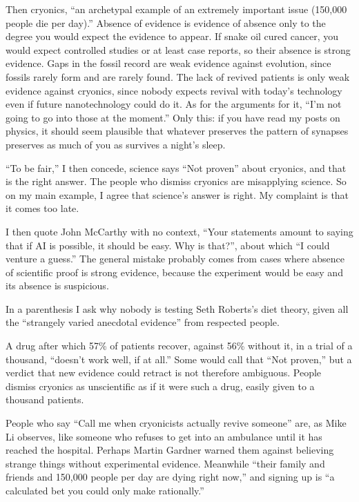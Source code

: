Then cryonics, ``an archetypal example of an extremely important issue (150,000 people die per day).''  Absence of evidence is evidence of absence only to the degree you would expect the evidence to appear. If snake oil cured cancer, you would expect controlled studies or at least case reports, so their absence is strong evidence. Gaps in the fossil record are weak evidence against evolution, since fossils rarely form and are rarely found. The lack of revived patients is only weak evidence against cryonics, since nobody expects revival with today's technology even if future nanotechnology could do it. As for the arguments for it, ``I'm not going to go into those at the moment.'' Only this: if you have read my posts on physics, it should seem plausible that whatever preserves the pattern of synapses preserves as much of you as survives a night's sleep. 

``To be fair,'' I then concede, science says ``Not proven'' about cryonics, and that is the right answer. The people who dismiss cryonics are misapplying science. So on my main example, I agree that science's answer is right. My complaint is that it comes too late.

I then quote John McCarthy with no context, ``Your statements amount to saying that if AI is possible, it should be easy. Why is that?'', about which ``I could venture a guess.'' The general mistake probably comes from cases where absence of scientific proof is strong evidence, because the experiment would be easy and its absence is suspicious.

In a parenthesis I ask why nobody is testing Seth Roberts's diet theory, given all the ``strangely varied anecdotal evidence'' from respected people.

A drug after which 57\% of patients recover, against 56\% without it, in a trial of a thousand, ``doesn't work well, if at all.'' Some would call that ``Not proven,'' but a verdict that new evidence could retract is not therefore ambiguous. People dismiss cryonics as unscientific as if it were such a drug, easily given to a thousand patients. 

People who say ``Call me when cryonicists actually revive someone'' are, as Mike Li observes, like someone who refuses to get into an ambulance until it has reached the hospital. Perhaps Martin Gardner warned them against believing strange things without experimental evidence.  Meanwhile ``their family and friends and 150,000 people per day are dying right now,'' and signing up is ``a calculated bet you could only make rationally.'' 

